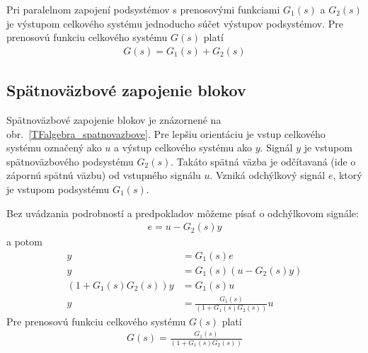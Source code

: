 \documentclass[a4paper, 10pt, ]{article}
\begin{document}
\begin{center}

    \makebox[\textwidth][c]{%
    
    }

	\label{TFalgebra_paralelne}

\end{center}

Pri paralelnom zapojení podsystémov s prenosovými funkciami $G_1(s)$ a $G_2(s)$ je výstupom celkového systému jednoducho súčet výstupov podsystémov. Pre prenosovú funkciu celkového systému $G(s)$ platí
\begin{align}
    G(s) = G_1(s) + G_2(s)
\end{align}




\subsection{Spätnoväzbové zapojenie blokov}

Spätnoväzbové zapojenie blokov je znázornené na obr.~\ref{TFalgebra_spatnovazbove}. Pre lepšiu orientáciu je vstup celkového systému označený ako $u$ a výstup celkového systému ako $y$. Signál $y$ je vstupom spätnoväzbového podsystému $G_2(s)$. Takáto spätná väzba je odčítavaná (ide o zápornú spätnú väzbu) od vstupného signálu $u$. Vzniká odchýlkový signál $e$, ktorý je vstupom podsystému $G_1(s)$.


\begin{center}

    \makebox[\textwidth][c]{%
    
    }

	\label{TFalgebra_spatnovazbove}

\end{center}

Bez uvádzania podrobností a predpokladov môžeme písať o odchýlkovom signále:
\begin{align}
    e = u - G_2(s) y
\end{align}
a potom
\begin{subequations}
    \begin{align}
        y &= G_1(s) e \\
        y &= G_1(s) \left( u - G_2(s) y \right) \\
        \left( 1 + G_1(s)G_2(s) \right) y &= G_1(s) u  \\
        y &= \frac{G_1(s)}{\left( 1 + G_1(s)G_2(s) \right)} u
    \end{align}
\end{subequations}
Pre prenosovú funkciu celkového systému $G(s)$ platí
\begin{align}
   G(s) = \frac{G_1(s)}{\left( 1 + G_1(s)G_2(s) \right)}
\end{align}
\end{document}
